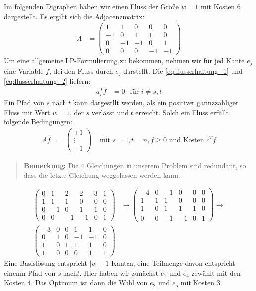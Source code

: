 \begin{example}
Im folgenden Digraphen haben wir einen Fluss der Größe $w=1$ mit Kosten $6$ dargestellt.
Es ergibt sich die Adjacenzmatrix:
\begin{align*}
A &= \begin{pmatrix}
1 & 1 & 0 & 0 & 0\\
-1 & 0 & 1 & 1 & 0\\
0 & -1 & -1 & 0 & 1 \\
0 & 0 & 0 & -1 & -1
\end{pmatrix}
\end{align*}
Um eine allgemeine LP-Formulierung zu bekommen, nehmen wir für jed Kante $e_j$ eine Variable $f$, dei den Fluss durch $e_j$ darstellt. Die \eqref{eq:flusserhaltung_1} und \eqref{eq:flusserhaltung_2} liefern:
\begin{align*}
a_i^T f &= 0 &\text{für } i \neq s,t 
\end{align*}
Ein Pfad von $s$ nach $t$ kann dargestllt werden, als ein positiver gannzzahliger Fluss mit Wert $w=1$, der $s$ verlässt und $t$ erreicht.
Solch ein Fluss erfüllt folgende Bedingungen:
\begin{align*}
A f &= \begin{pmatrix}
+1\\
\vdots\\
-1\end{pmatrix}
& \text{ mit } s=1, t=n, f\geq 0 \text{ und Kosten } c^Tf
\end{align*}
\begin{quote}
\textbf{Bemerkung:} Die 4 Gleichungen in unserem Problem sind redundant, so dass die letzte Gleichung weggelassen werden kann.
\end{quote}
\begin{align*}
\begin{pmatrix}
0 & 1 & 2 & 2 & 3 & 1\\
1 & 1 & 1 & 0 & 0 & 0\\
0 & -1 & 0 & 1 & 1 & 0\\
0 & 0 & -1 & -1 & 0 & 1
\end{pmatrix}
&\rightarrow \begin{pmatrix}
-4 & 0 & -1 & 0 & 0 & 0\\
1 & 1 & 1 & 0 & 0 & 0\\
1 & 0 & \underline{1} & 1 & 1 & 0\\
0 & 0 & -1 & -1 & 0 & 1
\end{pmatrix} \rightarrow \\
\begin{pmatrix}
-3 & 0 & 0 & 1 & 1 & 0\\
0 & 1 & 0 & -1 & -1 & 0\\
1 & 0 & 1 & 1 & 1 & 0\\
1 & 0 & 0 & 0 & 1 & 1
\end{pmatrix}
\end{align*}
Eine Basislösung entspricht $\lvert v \rvert -1$ Kanten, eine Teilmenge davon entspricht einenm Pfad von $s$ nach$t$.
Hier haben wir zunächst $e_1$ und $e_4$ gewählt mit den Kosten $4$. Das Optimum ist dann die Wahl von $e_2$ und $e_5$ mit Kosten $3$.
\end{example}
